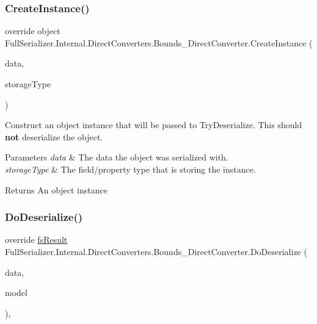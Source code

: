 \subsubsection{\texorpdfstring{Create\+Instance()}{CreateInstance()}}
{\footnotesize\ttfamily override object Full\+Serializer.\+Internal.\+Direct\+Converters.\+Bounds\+\_\+\+Direct\+Converter.\+Create\+Instance (\begin{DoxyParamCaption}\item[{\hyperlink{class_full_serializer_1_1fs_data}{fs\+Data}}]{data,  }\item[{Type}]{storage\+Type }\end{DoxyParamCaption})\hspace{0.3cm}{\ttfamily [inline]}}



Construct an object instance that will be passed to Try\+Deserialize. This should {\bfseries not} deserialize the object. 


\begin{DoxyParams}{Parameters}
{\em data} & The data the object was serialized with.\\
\hline
{\em storage\+Type} & The field/property type that is storing the instance.\\
\hline
\end{DoxyParams}
\begin{DoxyReturn}{Returns}
An object instance
\end{DoxyReturn}
\mbox{\label{class_full_serializer_1_1_internal_1_1_direct_converters_1_1_bounds___direct_converter_a2d4d2290cff048bd14274876f4814afe}} 
\subsubsection{\texorpdfstring{Do\+Deserialize()}{DoDeserialize()}}
{\footnotesize\ttfamily override \hyperlink{struct_full_serializer_1_1fs_result}{fs\+Result} Full\+Serializer.\+Internal.\+Direct\+Converters.\+Bounds\+\_\+\+Direct\+Converter.\+Do\+Deserialize (\begin{DoxyParamCaption}\item[{Dictionary$<$ string, \hyperlink{class_full_serializer_1_1fs_data}{fs\+Data} $>$}]{data,  }\item[{ref Bounds}]{model }\end{DoxyParamCaption})\hspace{0.3cm}{\ttfamily [inline]}, {\ttfamily [protected]}}



